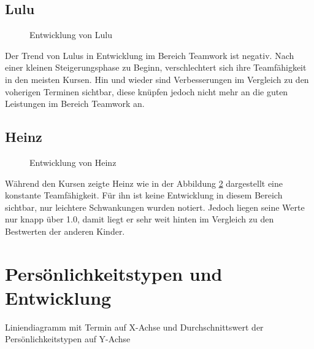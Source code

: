 \subsection{Lulu}
\begin{figure}[H]
	\centering
	\label{img:luluDevelopment}
	\caption{Entwicklung von Lulu}
\end{figure}
Der Trend von Lulus in Entwicklung im Bereich Teamwork ist negativ. Nach einer kleinen Steigerungsphase zu Beginn, verschlechtert sich ihre Teamfähigkeit in den meisten Kursen. Hin und wieder sind Verbesserungen im Vergleich zu den voherigen Terminen sichtbar, diese knüpfen jedoch nicht mehr an die guten Leistungen im Bereich Teamwork an.



\subsection{Heinz}
\begin{figure}[H]
	\centering
	\label{img:heinzDevelopment}
	\caption{Entwicklung von Heinz}
\end{figure}
Während den Kursen zeigte Heinz wie in der Abbildung \ref{img:heinzDevelopment} dargestellt eine konstante Teamfähigkeit. Für ihn ist keine Entwicklung in diesem Bereich sichtbar, nur leichtere Schwankungen wurden notiert. Jedoch liegen seine Werte nur knapp über 1.0, damit liegt er sehr weit hinten im Vergleich zu den Bestwerten der anderen Kinder.


\section{Persönlichkeitstypen und Entwicklung}
Liniendiagramm mit Termin auf X-Achse und Durchschnittswert der Persönlichkeitstypen auf Y-Achse


